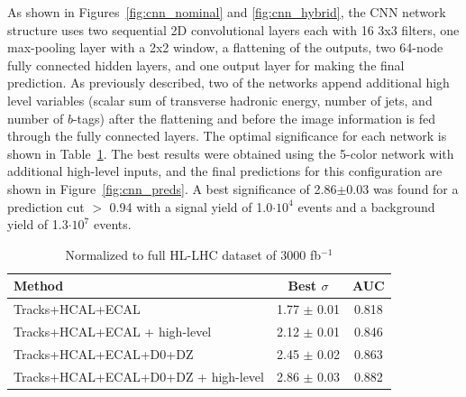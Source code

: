
As shown in Figures~\ref{fig:cnn_nominal} and \ref{fig:cnn_hybrid}, the CNN network structure uses two sequential 2D convolutional layers each with 16 3x3 filters, one max-pooling layer with a 2x2 window, a flattening of the outputs, two 64-node fully connected hidden layers, and one output layer for making the final prediction. As previously described, two of the networks append additional high level variables (scalar sum of transverse hadronic energy, number of jets, and number of $b$-tags) after the flattening and before the image information is fed through the fully connected layers. The optimal significance for each network is shown in Table~\ref{tab:cnnResults}. The best results were obtained using the 5-color network with additional high-level inputs, and the final predictions for this configuration are shown in Figure~\ref{fig:cnn_preds}. A best significance of 2.86$\pm$0.03 was found for a prediction cut $>$ 0.94 with a signal yield of 1.0$\cdot 10^4$ events and a background yield of 1.3$\cdot 10^7$ events.

\begin{table}[h!]
\label{tab:cnnResults}
  \begin{center}
    \begin{tabular}{|l|c|c|} %
      \hline\hline
      \textbf{Method} & Best $\sigma$ & AUC \\
      \hline
      Tracks+HCAL+ECAL & 1.77 $\pm$ 0.01 & 0.818 \\
      Tracks+HCAL+ECAL + high-level & 2.12 $\pm$ 0.01 & 0.846 \\
      Tracks+HCAL+ECAL+D0+DZ & 2.45 $\pm$ 0.02 & 0.863 \\
      Tracks+HCAL+ECAL+D0+DZ + high-level & 2.86 $\pm$ 0.03 & 0.882 \\

      \hline\hline
    \end{tabular}
    \caption{Normalized to full HL-LHC dataset of 3000 fb$^{-1}$}
  \end{center}
\end{table}


